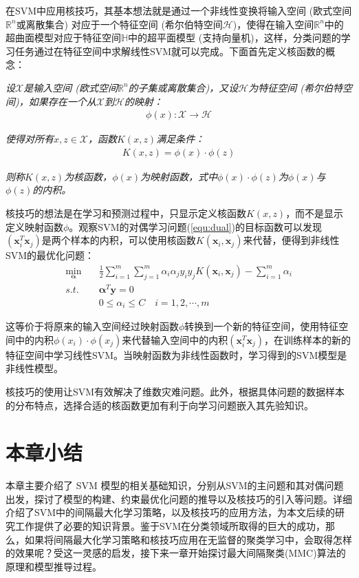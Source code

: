 在SVM中应用核技巧，其基本想法就是通过一个非线性变换将输入空间 (欧式空间$\mathbb{R}^n$或离散集合) 对应于一个特征空间 (希尔伯特空间$\mathcal{H}$)，使得在输入空间$\mathbb{R}^n$中的超曲面模型对应于特征空间$\mathbb{H}$中的超平面模型 (支持向量机)，这样，分类问题的学习任务通过在特征空间中求解线性SVM就可以完成。下面首先定义核函数的概念：
\begin{definition}
\emph{设$\mathcal{X}$是输入空间 (欧式空间$\mathbb{R}^n$的子集或离散集合)，又设$\mathcal{H}$为特征空间 (希尔伯特空间)，如果存在一个从$\mathcal{X}$到$\mathcal{H}$的映射：}
\begin{align} %
   \phi(x): \mathcal{X} \to \mathcal{H}
\end{align}

\emph{使得对所有$x,z \in \mathcal{X}$，函数$K(x,z)$满足条件：}
\begin{align} %
   K(x,z) = \phi(x)\cdot \phi(z)
\end{align}

\emph{则称$K(x,z)$为核函数，$\phi(x)$为映射函数，式中$\phi(x)\cdot\phi(z)$为$\phi(x)$与$\phi(z)$的内积。}
\end{definition}

核技巧的想法是在学习和预测过程中，只显示定义核函数$K(x,z)$，而不是显示定义映射函数$\phi$。观察SVM的对偶学习问题(\ref{equ:dual})的目标函数可以发现$(\mathbf{x}_i^T\mathbf{x}_j)$是两个样本的内积，可以使用核函数$K(\mathbf{x}_i,\mathbf{x}_j)$来代替，便得到非线性SVM的最优化问题：
\begin{equation}
\begin{split} %
   \min_{\mathbf{\alpha}} \quad & \frac{1}{2}\sum^m_{i=1}\sum^m_{j=1}\alpha_i\alpha_jy_iy_jK(\mathbf{x}_i,\mathbf{x}_j)-\sum^m_{i=1}\alpha_i \\
   s.t. \quad & \mathbf{\alpha}^T\mathbf{y}=0 \\
   & 0 \le \alpha_i \le C \quad  i=1,2,\cdots,m
   \label{equ:dual-kernel}
\end{split}
\end{equation}

这等价于将原来的输入空间经过映射函数$\phi$转换到一个新的特征空间，使用特征空间中的内积$\phi(x_i)\cdot\phi(x_j)$来代替输入空间中的内积$(\mathbf{x}_i^T\mathbf{x}_j)$，在训练样本的新的特征空间中学习线性SVM。当映射函数为非线性函数时，学习得到的SVM模型是非线性模型。

核技巧的使用让SVM有效解决了维数灾难问题。此外，根据具体问题的数据样本的分布特点，选择合适的核函数更加有利于向学习问题嵌入其先验知识。

\section{本章小结}
本章主要介绍了 SVM 模型的相关基础知识，分别从SVM的主问题和其对偶问题出发，探讨了模型的构建、约束最优化问题的推导以及核技巧的引入等问题。详细介绍了SVM中的间隔最大化学习策略，以及核技巧的应用方法，为本文后续的研究工作提供了必要的知识背景。鉴于SVM在分类领域所取得的巨大的成功，那么，如果将间隔最大化学习策略和核技巧应用在无监督的聚类学习中，会取得怎样的效果呢{\fangsong ？}受这一灵感的启发，接下来一章开始探讨最大间隔聚类(MMC)算法的原理和模型推导过程。